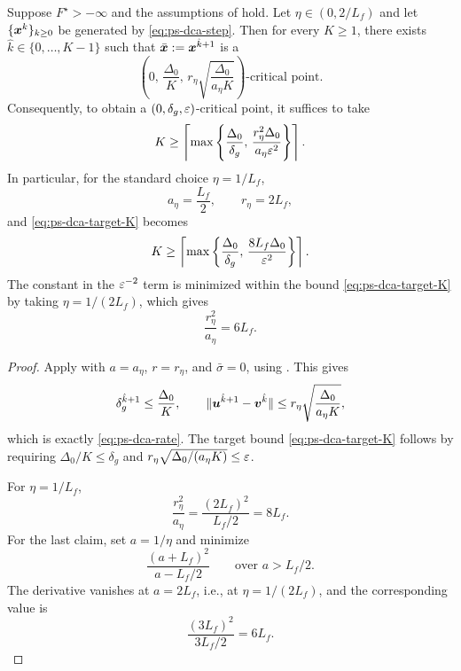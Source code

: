 \begin{corollary}
\label{cor:ps-dca-complexity}
Suppose $F^\star>-\infty$ and the assumptions of
 hold. Let
$\eta\in(0,2/L_f)$ and let $\{\bm{x}^k\}_{k\ge0}$ be generated by
\eqref{eq:ps-dca-step}. Then for every $K\ge1$, there exists
$\hat k\in\{0,\ldots,K-1\}$ such that
$\bar{\bm{x}}:=\bm{x}^{\hat k+1}$ is a
\begin{equation}
    \left(
        0,\,
        \frac{\Delta_0}{K},\,
        r_\eta
        \sqrt{
            \frac{\Delta_0}{a_\eta K}
        }
    \right)\text{-critical point}.
    \label{eq:ps-dca-rate}
\end{equation}
Consequently, to obtain a $(0,\delta_g,\varepsilon)$-critical point, it
suffices to take
\begin{equation}
    K
    \ge
    \left\lceil
    \max\left\{
        \frac{\Delta_0}{\delta_g},\,
        \frac{r_\eta^2\Delta_0}{a_\eta\varepsilon^2}
    \right\}
    \right\rceil .
    \label{eq:ps-dca-target-K}
\end{equation}
In particular, for the standard choice $\eta=1/L_f$,
\[
    a_\eta=\frac{L_f}{2},
    \qquad
    r_\eta=2L_f,
\]
and \eqref{eq:ps-dca-target-K} becomes
\begin{equation}
    K
    \ge
    \left\lceil
    \max\left\{
        \frac{\Delta_0}{\delta_g},\,
        \frac{8L_f\Delta_0}{\varepsilon^2}
    \right\}
    \right\rceil .
    \label{eq:ps-dca-standard-stepsize-K}
\end{equation}
The constant in the $\varepsilon^{-2}$ term is minimized within the bound
\eqref{eq:ps-dca-target-K} by taking $\eta=1/(2L_f)$, which gives
\[
    \frac{r_\eta^2}{a_\eta}=6L_f .
\]
\end{corollary}

\begin{proof}
Apply  with
$a=a_\eta$, $r=r_\eta$, and $\bar\sigma=0$, using
. This gives
\[
    \delta_g^{\hat k+1}\le\frac{\Delta_0}{K},
    \qquad
    \|\bm{u}^{\hat k+1}-\bm{v}^{\hat k}\|
    \le
    r_\eta
    \sqrt{\frac{\Delta_0}{a_\eta K}},
\]
which is exactly \eqref{eq:ps-dca-rate}. The target bound
\eqref{eq:ps-dca-target-K} follows by requiring
$\Delta_0/K\le\delta_g$ and
$r_\eta\sqrt{\Delta_0/(a_\eta K)}\le\varepsilon$.

For $\eta=1/L_f$,
\[
    \frac{r_\eta^2}{a_\eta}
    =
    \frac{(2L_f)^2}{L_f/2}
    =
    8L_f.
\]
For the last claim, set $a=1/\eta$ and minimize
\[
    \frac{(a+L_f)^2}{a-L_f/2}
    \qquad
    \text{over }a>L_f/2.
\]
The derivative vanishes at $a=2L_f$, i.e., at
$\eta=1/(2L_f)$, and the corresponding value is
\[
    \frac{(3L_f)^2}{3L_f/2}=6L_f.
\]
\end{proof}

